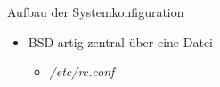 
\begin{slide}{Aufbau der Systemkonfiguration}
	\begin{itemize}
		\item{BSD artig zentral \"{u}ber eine Datei
			\begin{itemize}
				\item{\textit{/etc/rc.conf}
					
				}
			\end{itemize}
		}

	\end{itemize}
\end{slide}

